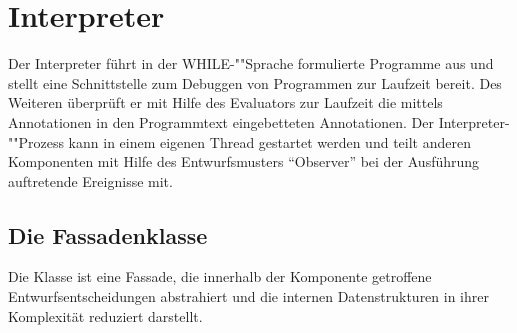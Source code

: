 \section{Interpreter}

Der Interpreter führt in der WHILE-""Sprache formulierte Programme aus und stellt eine Schnittstelle zum Debuggen von Programmen zur Laufzeit bereit. Des Weiteren überprüft er mit Hilfe des Evaluators zur Laufzeit die mittels Annotationen in den Programmtext eingebetteten Annotationen. Der Interpreter-""Prozess kann in einem eigenen Thread gestartet werden und teilt anderen Komponenten mit Hilfe des Entwurfsmusters "`Observer"' bei der Ausführung auftretende Ereignisse mit.

\subsection{Die Fassadenklasse }
Die Klasse  ist eine Fassade, die innerhalb der Komponente getroffene Entwurfsentscheidungen abstrahiert und die internen Datenstrukturen in ihrer Komplexität reduziert darstellt.

